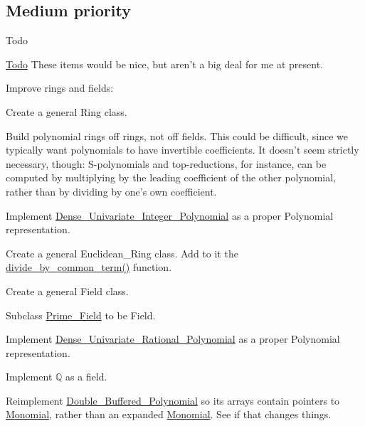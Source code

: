 \hypertarget{index_mdpri}{}\subsection{Medium priority}\label{index_mdpri}
\begin{DoxyRefDesc}{Todo}
\item[\hyperlink{todo__todo000002}{Todo}]These items would be nice, but aren't a big deal for me at present.
\begin{DoxyItemize}
\item Improve rings and fields\+:
\begin{DoxyItemize}
\item Create a general {\ttfamily Ring} class.
\begin{DoxyItemize}
\item Build polynomial rings off rings, not off fields. This could be difficult, since we typically want polynomials to have invertible coefficients. It doesn't seem strictly necessary, though\+: S-\/polynomials and top-\/reductions, for instance, can be computed by multiplying by the leading coefficient of the other polynomial, rather than by dividing by one's own coefficient.
\item Implement \hyperlink{group__polygroup_class_dense___univariate___integer___polynomial}{Dense\+\_\+\+Univariate\+\_\+\+Integer\+\_\+\+Polynomial} as a proper {\ttfamily Polynomial} representation.
\item Create a general {\ttfamily Euclidean\+\_\+\+Ring} class. Add to it the \hyperlink{group__utils_gaefe33f79de88accbc6f455e91dab9288}{divide\+\_\+by\+\_\+common\+\_\+term()} function.
\end{DoxyItemize}
\item Create a general {\ttfamily Field} class.
\begin{DoxyItemize}
\item Subclass \hyperlink{group___fields_group_class_prime___field}{Prime\+\_\+\+Field} to be {\ttfamily Field}.
\item Implement \hyperlink{group__polygroup_class_dense___univariate___rational___polynomial}{Dense\+\_\+\+Univariate\+\_\+\+Rational\+\_\+\+Polynomial} as a proper {\ttfamily Polynomial} representation.
\item Implement $\mathbb Q$ as a field.
\end{DoxyItemize}
\end{DoxyItemize}
\item Reimplement \hyperlink{group__polygroup_class_double___buffered___polynomial}{Double\+\_\+\+Buffered\+\_\+\+Polynomial} so its arrays contain pointers to \hyperlink{group__polygroup_class_monomial}{Monomial}, rather than an expanded \hyperlink{group__polygroup_class_monomial}{Monomial}. See if that changes things.

\end{DoxyItemize}
\end{DoxyRefDesc}
